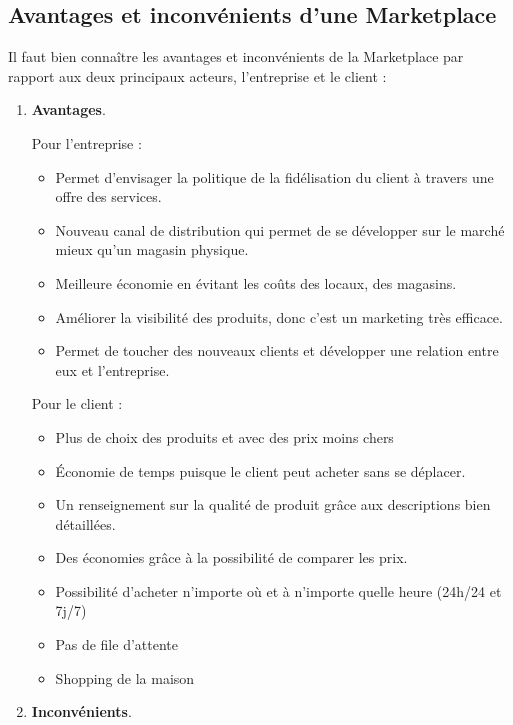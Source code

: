 \subsection{Avantages et inconvénients d’une Marketplace }

Il faut bien connaître les avantages et inconvénients de la Marketplace par rapport aux deux principaux acteurs, l’entreprise et le client :
\begin{enumerate}
	\item  \textbf{Avantages}.
	
	Pour l'entreprise : 
\begin{itemize}[label=\textbullet, font=\LARGE \color{blue}]
	\item Permet d’envisager la politique de la fidélisation du client à travers une offre des services.
	\item Nouveau canal de distribution qui permet de se développer sur le marché mieux qu’un magasin physique.
	\item Meilleure économie en évitant les coûts des locaux, des magasins.
	\item Améliorer la visibilité des produits, donc c’est un marketing très efficace.
	\item Permet de toucher des nouveaux clients et développer une relation entre eux et l’entreprise.
\end{itemize}
	Pour le client : 
\begin{itemize}[label=\textbullet, font=\LARGE \color{blue}]
	\item Plus de choix des produits et avec des prix moins chers
	\item Économie de temps puisque le client peut acheter sans se déplacer.
	\item Un renseignement sur la qualité de produit grâce aux descriptions bien détaillées.
	\item Des économies grâce à la possibilité de comparer les prix.
	\item Possibilité d’acheter n’importe où et à n’importe quelle heure (24h/24 et 7j/7)
	\item Pas de file d’attente
	\item Shopping de la maison 
\end{itemize}
	\item  \textbf{Inconvénients}.
	

\end{enumerate}
